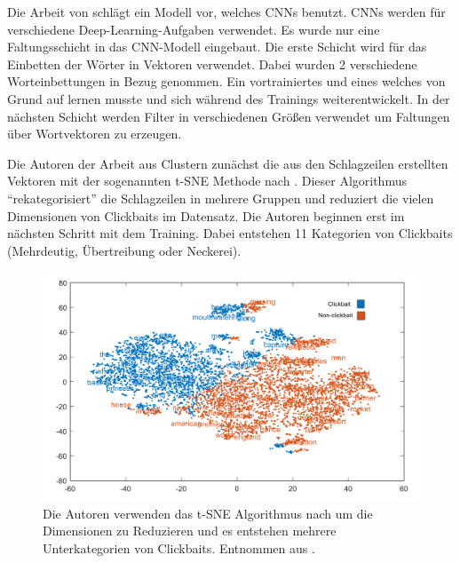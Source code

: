 Die Arbeit von \cite*{Agrawal2017} schlägt ein Modell vor, welches CNNs benutzt. CNNs werden für verschiedene Deep-Learning-Aufgaben verwendet. Es wurde nur eine Faltungsschicht in das CNN-Modell eingebaut. Die erste Schicht wird für das Einbetten der Wörter in Vektoren verwendet. Dabei wurden 2 verschiedene Worteinbettungen in Bezug genommen. Ein vortrainiertes und eines welches von Grund auf lernen musste und sich während des Trainings weiterentwickelt. In der nächsten Schicht werden Filter in verschiedenen Größen verwendet um Faltungen über Wortvektoren zu erzeugen.

Die Autoren der Arbeit aus \cite*{Pujahari} Clustern zunächst die aus den Schlagzeilen erstellten Vektoren mit der sogenannten t-SNE Methode nach \cite{VanDerMaaten2008}. Dieser Algorithmus \enquote{rekategorisiert} die Schlagzeilen in mehrere Gruppen und reduziert die vielen Dimensionen von Clickbaits im Datensatz. Die Autoren beginnen erst im nächsten Schritt mit dem Training. Dabei entstehen 11 Kategorien von Clickbaits (Mehrdeutig, Übertreibung oder Neckerei).


\begin{figure}[H]
    \centering
    \includegraphics[width=12cm]{kapitel4/tsne.png}
    \caption[Clustering von Überschriften mit t-SNE]{Die Autoren verwenden das t-SNE Algorithmus nach \cite{VanDerMaaten2008} um die Dimensionen zu Reduzieren und es entstehen mehrere Unterkategorien von Clickbaits. Entnommen aus \cite*{Pujahari}.}
    \label{TSNE}
\end{figure}

